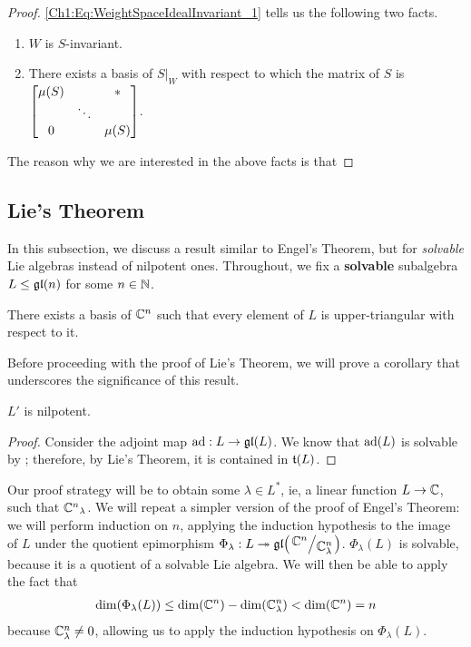 \begin{proof}
    \sorry

    \eqref{Ch1:Eq:WeightSpaceIdealInvariant_1} tells us the following two facts.
    \begin{enumerate}
        \item $W$ is $S$-invariant.
        \sorry
        \item There exists a basis of $S\vert_{W}$ with respect to which the matrix of $S$ is
        $\displaystyle \begin{bmatrix}
            \mu\!\left( S \right) & & * \\
            & \ddots & \\
            0 & & \mu\!\left( S \right)
        \end{bmatrix}$.
        \sorry
    \end{enumerate}

    The reason why we are interested in the above facts is that 

    \sorry
\end{proof}

\subsection{Lie's Theorem}

In this subsection, we discuss a result similar to Engel's Theorem, but for \textit{solvable} Lie algebras instead of nilpotent ones. Throughout, we fix a \textbf{solvable} subalgebra $L \leq \mathfrak{gl}\!\left( n \right)$ for some $n \in \mathbb{N}$.

\begin{boxtheorem}\label{Ch1:Thm:Lie}
    There exists a basis of $\mathbb{C}^n$ such that every element of $L$ is upper-triangular with respect to it.
\end{boxtheorem}

Before proceeding with the proof of Lie's Theorem, we will prove a corollary that underscores the significance of this result.

\begin{boxcorollary}\label{Ch1:Cor:SolvableDerivNilpotent}
    $L'$ is nilpotent.
\end{boxcorollary}
\begin{proof}
    Consider the adjoint map $\operatorname{ad} : L \to \mathfrak{gl}\!\left( L \right)$. We know that $\operatorname{ad}\!\left( L \right)$ is solvable by \sorry; therefore, by Lie's Theorem, it is contained in $\mathfrak{t}\!\left( L \right)$. %
    \sorry
\end{proof}

Our proof strategy will be to obtain some $\lambda \in L^*$, ie, a linear function $L \to \mathbb{C}$, such that ${\mathbb{C}^n}_{\lambda}$. We will repeat a simpler version of the proof of Engel's Theorem: we will perform induction on $n$, applying the induction hypothesis to the image of $L$ under the quotient epimorphism $\Phi_\lambda : L \surj \gl{\quotient{\C^n}{\C^n_\lambda}}$. $\Phi_\lambda(L)$ is solvable, because it is a quotient of a solvable Lie algebra. We will then be able to apply the fact that
\begin{align*}
    \dim\!\left( \Phi_\lambda(L) \right)
    \leq \dim\!\left( \mathbb{C}^n \right) - \dim\!\left( \mathbb{C}^n_\lambda \right)
    < \dim\!\left( \mathbb{C}^n \right) = n
\end{align*}
because $\mathbb{C}^n_{\lambda} \neq 0$, allowing us to apply the induction hypothesis on $\Phi_\lambda(L)$.


